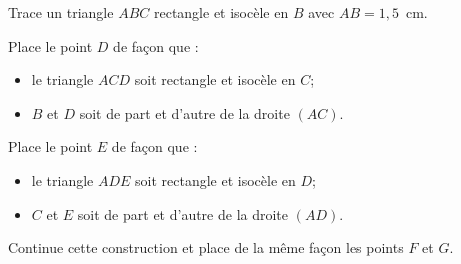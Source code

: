 \begin{myenumerate}
\item Trace un triangle $ABC$ rectangle et isocèle en $B$ avec
$AB=1,5$~cm.
\item Place le point $D$ de façon que :
\begin{itemize}
\item le triangle $ACD$ soit rectangle et isocèle en $C$;
\item $B$ et $D$ soit de part et d'autre de la droite $(AC)$.
\end{itemize}
\item Place le point $E$ de façon que :
\begin{itemize}
\item le triangle $ADE$ soit rectangle et isocèle en $D$;
\item $C$ et $E$ soit de part et d'autre de la droite $(AD)$.
\end{itemize}
\item Continue cette construction et place de la même façon les points
$F$ et $G$.
\end{myenumerate}